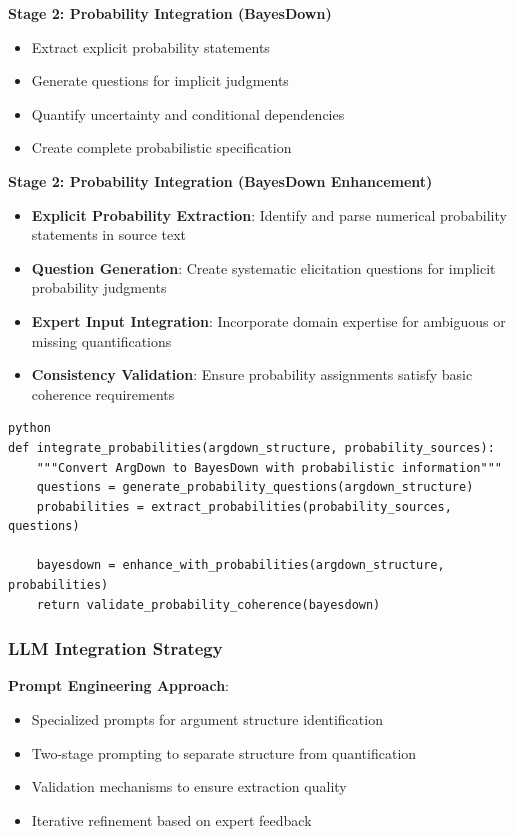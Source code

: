 \documentclass[
  11pt,
  letterpaper,
]{book}
\providecommand{\tightlist}{%
  \setlength{\itemsep}{0pt}\setlength{\parskip}{0pt}}
\begin{document}
\textbf{Stage 2: Probability Integration (BayesDown)}

\begin{itemize}
\tightlist
\item
  Extract explicit probability statements
\item
  Generate questions for implicit judgments
\item
  Quantify uncertainty and conditional dependencies
\item
  Create complete probabilistic specification
\end{itemize}

\textbf{Stage 2: Probability Integration (BayesDown Enhancement)}

\begin{itemize}
\tightlist
\item
  \textbf{Explicit Probability Extraction}: Identify and parse numerical
  probability statements in source text
\item
  \textbf{Question Generation}: Create systematic elicitation questions
  for implicit probability judgments
\item
  \textbf{Expert Input Integration}: Incorporate domain expertise for
  ambiguous or missing quantifications
\item
  \textbf{Consistency Validation}: Ensure probability assignments
  satisfy basic coherence requirements
\end{itemize}

\begin{verbatim}
python
def integrate_probabilities(argdown_structure, probability_sources):
    """Convert ArgDown to BayesDown with probabilistic information"""
    questions = generate_probability_questions(argdown_structure)
    probabilities = extract_probabilities(probability_sources, questions)
    
    bayesdown = enhance_with_probabilities(argdown_structure, probabilities)
    return validate_probability_coherence(bayesdown)
\end{verbatim}

\subsubsection{LLM Integration Strategy}\label{sec-llm-integration}

\textbf{Prompt Engineering Approach}:

\begin{itemize}
\tightlist
\item
  Specialized prompts for argument structure identification
\item
  Two-stage prompting to separate structure from quantification
\item
  Validation mechanisms to ensure extraction quality
\item
  Iterative refinement based on expert feedback
\end{itemize}
\end{document}
